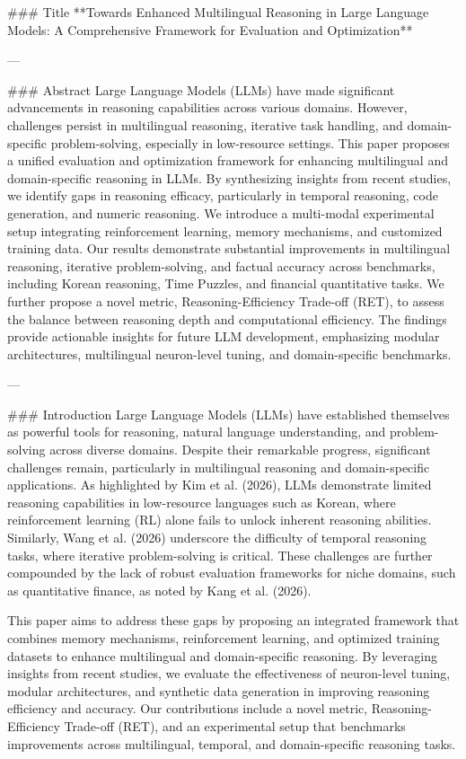 ### Title
**Towards Enhanced Multilingual Reasoning in Large Language Models: A Comprehensive Framework for Evaluation and Optimization**

---

### Abstract
Large Language Models (LLMs) have made significant advancements in reasoning capabilities across various domains. However, challenges persist in multilingual reasoning, iterative task handling, and domain-specific problem-solving, especially in low-resource settings. This paper proposes a unified evaluation and optimization framework for enhancing multilingual and domain-specific reasoning in LLMs. By synthesizing insights from recent studies, we identify gaps in reasoning efficacy, particularly in temporal reasoning, code generation, and numeric reasoning. We introduce a multi-modal experimental setup integrating reinforcement learning, memory mechanisms, and customized training data. Our results demonstrate substantial improvements in multilingual reasoning, iterative problem-solving, and factual accuracy across benchmarks, including Korean reasoning, Time Puzzles, and financial quantitative tasks. We further propose a novel metric, Reasoning-Efficiency Trade-off (RET), to assess the balance between reasoning depth and computational efficiency. The findings provide actionable insights for future LLM development, emphasizing modular architectures, multilingual neuron-level tuning, and domain-specific benchmarks.

---

### Introduction
Large Language Models (LLMs) have established themselves as powerful tools for reasoning, natural language understanding, and problem-solving across diverse domains. Despite their remarkable progress, significant challenges remain, particularly in multilingual reasoning and domain-specific applications. As highlighted by Kim et al. (2026), LLMs demonstrate limited reasoning capabilities in low-resource languages such as Korean, where reinforcement learning (RL) alone fails to unlock inherent reasoning abilities. Similarly, Wang et al. (2026) underscore the difficulty of temporal reasoning tasks, where iterative problem-solving is critical. These challenges are further compounded by the lack of robust evaluation frameworks for niche domains, such as quantitative finance, as noted by Kang et al. (2026).

This paper aims to address these gaps by proposing an integrated framework that combines memory mechanisms, reinforcement learning, and optimized training datasets to enhance multilingual and domain-specific reasoning. By leveraging insights from recent studies, we evaluate the effectiveness of neuron-level tuning, modular architectures, and synthetic data generation in improving reasoning efficiency and accuracy. Our contributions include a novel metric, Reasoning-Efficiency Trade-off (RET), and an experimental setup that benchmarks improvements across multilingual, temporal, and domain-specific reasoning tasks.

